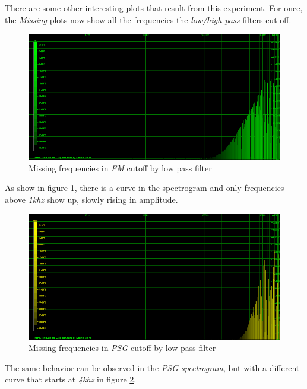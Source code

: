\documentclass[10pt,a4paper]{report}
\begin{document}
There are some other interesting plots that result from this experiment. For once, the \textit{Missing} plots now show all the frequencies the \textit{low/high pass} filters cut off.

\begin{figure}[H]
	\centering
	\includegraphics[width=1.0\linewidth]{plots/Plot4-4-Missing-FM.png}
	\caption[Missing FM]{Missing frequencies in \textit{FM} cutoff by low pass filter}
	\label{fig:plot4-4-missing-fm}
\end{figure}

As show in figure \ref{fig:plot4-4-missing-fm}, there is a curve in the spectrogram and only frequencies above \textit{1khz} show up, slowly rising in amplitude.

\begin{figure}[H]
	\centering
	\includegraphics[width=1.0\linewidth]{plots/Plot4-5-Missing-PSG.png}
	\caption[Missing PSG]{Missing frequencies in \textit{PSG} cutoff by low pass filter}
	\label{fig:plot4-5-missing-psg}
\end{figure}

The same behavior can be observed in the \textit{PSG spectrogram}, but with a different curve that starts at \textit{4khz} in figure \ref{fig:plot4-5-missing-psg}.
\end{document}
